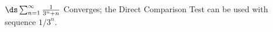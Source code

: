 {$\ds \sum_{n=1}^\infty \frac{1}{3^n+n}$
}
{Converges; the Direct Comparison Test can be used with sequence $1/3^n$. 
}
